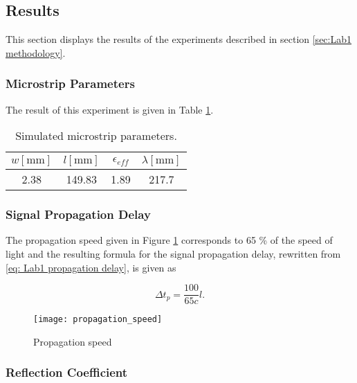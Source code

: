 \documentclass[report.tex]{subfiles}
\begin{document}
\subsection{Results}
This section displays the results of the experiments described in section \ref{sec:Lab1 methodology}.

\subsubsection{Microstrip Parameters}
The result of this experiment is given in Table \ref{table: Lab1 Simulated Microstrip parameters}.

\begin{table}[h]
    \centering
    \caption{Simulated microstrip parameters.\label{table: Lab1 Simulated Microstrip parameters}}
    \begin{tabular}{c | c | c | c}
        $w [\text{mm}]$ & $l [\text{mm}]$ & $\epsilon_{eff}$ & $\lambda [\text{mm}]$\\
        \hline
		2.38 & 149.83 & 1.89 & 217.7
    \end{tabular}
\end{table}

\subsubsection{Signal Propagation Delay}\label{subsubsec:Lab 1 Signal propagation delay}

The propagation speed given in Figure \ref{fig:Lab1 propagation speed} corresponds to 65 \% of the speed of light and the resulting formula for the signal propagation delay, rewritten from \ref{eq: Lab1 propagation delay}, is given as

\begin{equation}
	\Delta t_p = \dfrac{100}{65 c}l.
\end{equation}

\vspace*{\fill}

\begin{figure}[h]
    \centering
	\texttt{[image: propagation\_speed]}
	\caption{Propagation speed}
	\label{fig:Lab1 propagation speed}
\end{figure}

\vspace*{\fill}

\clearpage

\subsubsection{Reflection Coefficient}\label{subsubsec:Lab1 ref coeff}
\end{document}
